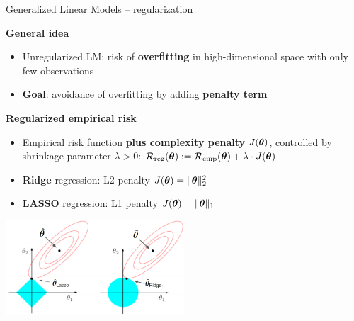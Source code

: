 \documentclass[11pt,compress,t,notes=noshow, xcolor=table]{beamer}
\newcommand{\highlight}[1]{\textcolor{hlcol}{\textbf{#1}}}
\begin{document}
\begin{frame2}{Generalized Linear Models -- regularization}

  \highlight{General idea}

\begin{itemize}
  \item Unregularized LM: risk of \textbf{overfitting} in high-dimensional 
  space with only few observations
  \item \textbf{Goal}: avoidance of overfitting by adding \textbf{penalty term}
\end{itemize}





        
\highlight{Regularized empirical risk}

\begin{itemize}
  \item Empirical risk function \textbf{plus complexity penalty} 
  $J(\bm{\theta})$, controlled by shrinkage parameter $\lambda > 0$:
  $\mathcal{R}_{\text{reg}}(\bm{\theta}) := \mathcal{R}_{\text{emp}}(\bm{\theta}) + \lambda \cdot J(\bm{\theta})$
    \item \textbf{Ridge} regression: L2 penalty $J(\bm{\theta}) = \|\bm{\theta}\|_2^2 $
    \item \textbf{LASSO} regression: L1 penalty $J(\bm{\theta}) = \|\bm{\theta}\|_1 $

\end{itemize}

\includegraphics[width=0.5\textwidth]{figure/l1_l2_hat.png}

\end{frame2}
\end{document}
